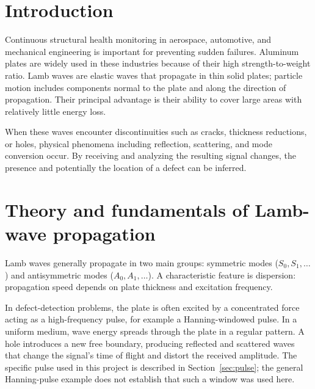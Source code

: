 \documentclass[11pt,a4paper]{article}
\begin{document}
\section{Introduction}
Continuous structural health monitoring in aerospace, automotive, and mechanical engineering is important for preventing sudden failures. Aluminum plates are widely used in these industries because of their high strength-to-weight ratio. Lamb waves are elastic waves that propagate in thin solid plates; particle motion includes components normal to the plate and along the direction of propagation. Their principal advantage is their ability to cover large areas with relatively little energy loss.

When these waves encounter discontinuities such as cracks, thickness reductions, or holes, physical phenomena including reflection, scattering, and mode conversion occur. By receiving and analyzing the resulting signal changes, the presence and potentially the location of a defect can be inferred.
\section{Theory and fundamentals of Lamb-wave propagation}
Lamb waves generally propagate in two main groups: symmetric modes ($S_0,S_1,\ldots$) and antisymmetric modes ($A_0,A_1,\ldots$). A characteristic feature is dispersion: propagation speed depends on plate thickness and excitation frequency.

In defect-detection problems, the plate is often excited by a concentrated force acting as a high-frequency pulse, for example a Hanning-windowed pulse. In a uniform medium, wave energy spreads through the plate in a regular pattern. A hole introduces a new free boundary, producing reflected and scattered waves that change the signal's time of flight and distort the received amplitude. The specific pulse used in this project is described in Section~\ref{sec:pulse}; the general Hanning-pulse example does not establish that such a window was used here.
\end{document}
